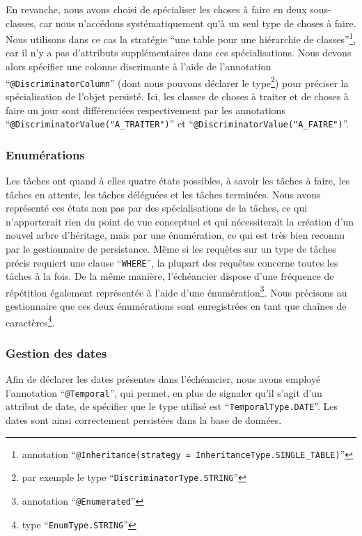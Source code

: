 \documentclass[a4paper, french, 11pt]{report}
\begin{document}
En revanche, nous avons choisi de spécialiser les choses à faire en deux sous-classes, car nous n'accédons systématiquement qu'à un seul type de choses à faire.
Nous utilisons dans ce cas la stratégie ``une table pour une hiérarchie de classes''\footnote{annotation ``\texttt{@Inheritance(strategy = InheritanceType.SINGLE\_TABLE)}''}, car il n'y a pas d'attributs supplémentaires dans ces spécialisations.
Nous devons alors spécifier une colonne discrimante à l'aide de l'annotation ``\texttt{@DiscriminatorColumn}'' (dont nous pouvons déclarer le type\footnote{par exemple le type ``\texttt{DiscriminatorType.STRING}''}) pour préciser la spécialisation de l'objet persisté.
Ici, les classes de choses à traiter et de choses à faire un jour sont différenciées respectivement par les annotations ``\texttt{@DiscriminatorValue("A\_TRAITER")}'' et ``\texttt{@Dis\-cri\-mi\-na\-tor\-Value("A\_FAIRE")}''.

\subsubsection{Enumérations}
Les tâches ont quand à elles quatre états possibles, à savoir les tâches à faire, les tâches en attente, les tâches déléguées et les tâches terminées.
Nous avons représenté ces états non pas par des spécialisations de la tâches, ce qui n'apporterait rien du point de vue conceptuel et qui nécessiterait la création d'un nouvel arbre d'héritage, mais par une énumération, ce qui est très bien reconnu par le gestionnaire de persistance.
Même si les requêtes sur un type de tâches précis requiert une clause ``\texttt{WHERE}'', la plupart des requêtes concerne toutes les tâches à la fois.
De la même manière, l'échéancier dispose d'une fréquence de répétition également représentée à l'aide d'une énumération\footnote{annotation ``\texttt{@Enumerated}''}.
Nous précisons au gestionnaire que ces deux énumérations sont enregistrées en tant que chaînes de caractères\footnote{type ``\texttt{EnumType.STRING}''}.

\subsubsection{Gestion des dates}
Afin de déclarer les dates présentes dans l'échéancier, nous avons employé l'annotation ``\texttt{@Temporal}'', qui permet, en plus de signaler qu'il s'agit d'un attribut de date, de spécifier que le type utilisé est ``\texttt{TemporalType.DATE}''.
Les dates sont ainsi correctement persistées dans la base de données.
\end{document}
